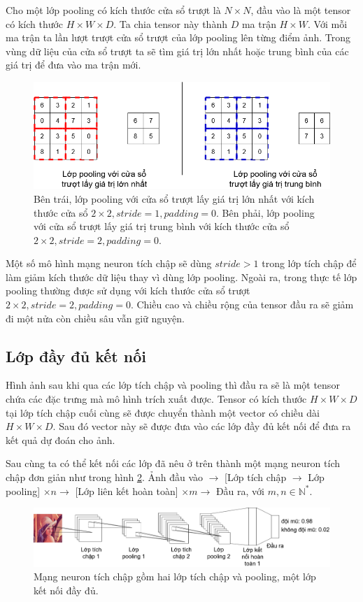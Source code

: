 Cho một lớp pooling có kích thước cửa sổ trượt là $N \times N$, đầu vào là một tensor có kích thước $H \times W \times D$. Ta chia tensor này thành $D$ ma trận $H \times W$. Với mỗi ma trận ta lần lượt trượt cửa sổ trượt của lớp pooling lên từng điểm ảnh. Trong vùng dữ liệu của cửa sổ trượt ta sẽ tìm giá trị lớn nhất hoặc trung bình của các giá trị để đưa vào ma trận mới.
\begin{figure}[ht!]
	\centerline{\includegraphics[scale=0.4]{images/pooling.png}}
  	\caption{Bên trái, lớp pooling với cửa sổ trượt lấy giá trị lớn nhất với kích thước cửa sổ $2 \times 2, stride=1, padding=0$. Bên phải, lớp pooling với cửa sổ trượt lấy giá trị trung bình với kích thước cửa sổ $2 \times 2, stride=2, padding=0$.}
  	\label{fig:pooling}
\end{figure}
Một số mô hình mạng neuron tích chập sẽ dùng $stride>1$ trong lớp tích chập để làm giảm kích thước dữ liệu thay vì dùng lớp pooling. Ngoài ra, trong thực tế lớp pooling thường được sử dụng với kích thước cửa sổ trượt $2 \times 2, stride=2, padding=0$. Chiều cao và chiều rộng của tensor đầu ra sẽ giảm đi một nửa còn chiều sâu vẫn giữ nguyện.
\subsection{Lớp đầy đủ kết nối}
Hình ảnh sau khi qua các lớp tích chập và pooling thì đầu ra sẽ là một tensor chứa các đặc trưng mà mô hình trích xuất được. Tensor có kích thước $H \times W \times D$ tại lớp tích chập cuối cùng sẽ được chuyển thành một vector có chiều dài $H \times W \times D$. Sau đó vector này sẽ được đưa vào các lớp đầy đủ kết nối để đưa ra kết quả dự đoán cho ảnh.

Sau cùng ta có thể kết nối các lớp đã nêu ở trên thành một mạng neuron tích chập đơn giản như trong hình \ref{fig:cnn_simplified}.
Ảnh đầu vào $\rightarrow$ [Lớp tích chập $\rightarrow$ Lớp pooling] $\times n \rightarrow$ [Lớp liên kết hoàn toàn] $\times m \rightarrow$ Đầu ra, với $m,n \in {\mathbb{N}}^*$.
\begin{figure}[ht!]
	\centerline{\includegraphics[scale=0.25]{images/cnn_simplified.png}}
  	\caption{Mạng neuron tích chập gồm hai lớp tích chập và pooling, một lớp kết nối đầy đủ.}
  	\label{fig:cnn_simplified}
\end{figure}
